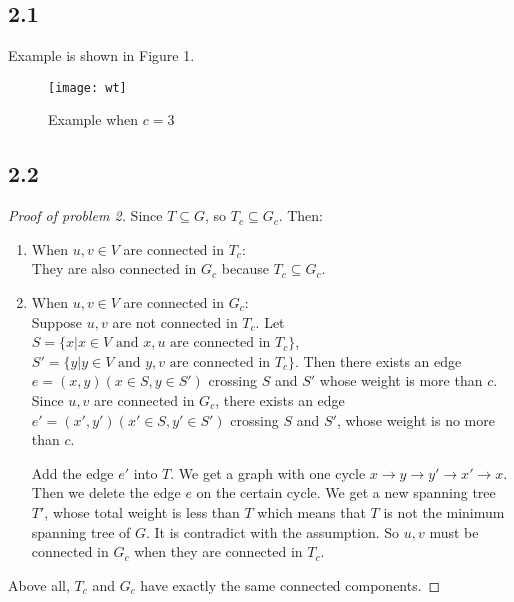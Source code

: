\documentclass[paper=a4, fontsize=11pt]{scrartcl} %
\numberwithin{figure}{section} %
\numberwithin{table}{section} %
\begin{document}
\subsection*{2.1}
    Example is shown in Figure 1.
\begin{figure}
 \begin{center}
        \texttt{[image: wt]}
        \caption{Example when $c = 3$}
 \end{center}
\end{figure}
\subsection*{2.2}
    \begin{proof}[Proof of problem 2]
    Since $T \subseteq G$, so $T_{c} \subseteq G_{c}$. Then:
    \begin{enumerate}
        \item When $u, v \in V$ are connected in $T_{c}$:\\
            They are also connected in $G_{c}$ because $T_c \subseteq G_c$.

        \item When $u,v \in V$ are connected in $G_{c}$:\\
            Suppose $u, v$ are not connected in $T_{c}$. Let $S=\{x | x \in V \textrm{ and } x, u \textrm{ are connected in } T_c\}$, $S'=\{y | y \in V \textrm{ and } y, v \textrm{ are connected in } T_c\}$. Then there exists an edge $e = (x,y) (x \in S, y \in S')$ crossing $S$ and $S'$ whose weight is more than $c$. Since $u, v$ are connected in $G_{c}$, there exists an edge $e'=(x',y') (x' \in S, y' \in S')$ crossing $S$ and $S'$, whose weight is no more than $c$.

            Add the edge $e'$ into $T$. We get a graph with one cycle $x \longrightarrow y \longrightarrow y' \longrightarrow x' \longrightarrow x$.
Then we delete the edge $e$ on the certain cycle. We get a new spanning tree $T'$, whose total weight is less than $T$ which means that $T$ is not the minimum spanning tree of $G$. It is contradict with the assumption. So $u, v$ must be connected in $G_c$ when they are connected in $T_c$.
    \end{enumerate}
            Above all, $T_{c}$ and $G_{c}$ have exactly the same connected components.
    \end{proof}

\end{document}
